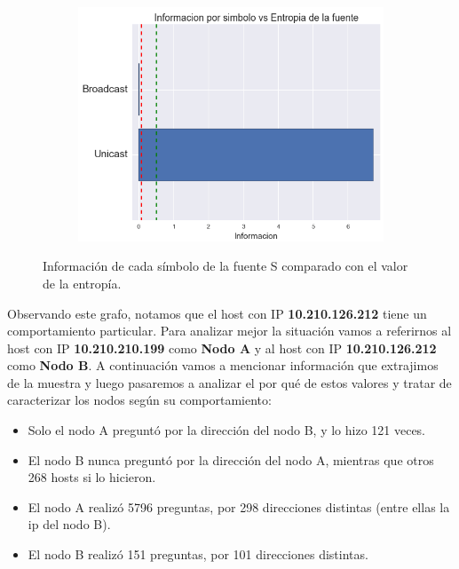 \begin{figure}[h]
  \begin{subfigure}{.5\textwidth}
    \includegraphics[width=\textwidth]{imagenes/laboratorio/info_vs_entropia_BRvsUN.png}
  \end{subfigure}
  \label{fig:exp1_labo_infovsentro_BRvsUN}
  \caption{Información de cada símbolo de la fuente S comparado con el valor de la entropía.}
\end{figure}

\par Observando este grafo, notamos que el host con IP \textbf{10.210.126.212} tiene un comportamiento particular. Para analizar mejor la situación vamos a referirnos al host con IP \textbf{10.210.210.199} como \textbf{Nodo A} y al host con IP \textbf{10.210.126.212} como \textbf{Nodo B}. A continuación vamos a mencionar información que extrajimos de la muestra y luego pasaremos a analizar el por qué de estos valores y tratar de caracterizar los nodos según su comportamiento:

\begin{itemize}
  \item Solo el nodo A preguntó por la dirección del nodo B, y lo hizo 121 veces.
  \item El nodo B nunca preguntó por la dirección del nodo A, mientras que otros 268 hosts si lo hicieron.
  \item El nodo A realizó 5796 preguntas, por 298 direcciones distintas (entre ellas la ip del nodo B).
  \item El nodo B realizó 151 preguntas, por 101 direcciones distintas.
\end{itemize}

